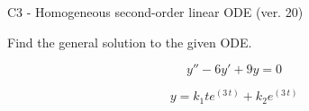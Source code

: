 \begin{exercise}
  \begin{exerciseTitle}C3 - Homogeneous second-order linear ODE (ver. 20)\end{exerciseTitle}
  \begin{exerciseStatement}
    
Find the general solution to the given ODE.

    
\[y''-6y'+9y = 0\]

  \end{exerciseStatement}
  \begin{exerciseAnswer}
    
\[y= k_{1} t e^{\left(3 \, t\right)} + k_{2} e^{\left(3 \, t\right)}\]

  \end{exerciseAnswer}
\end{exercise}